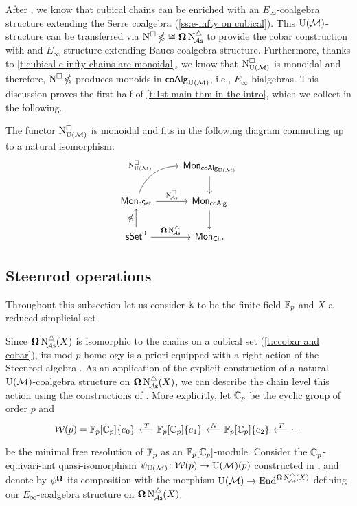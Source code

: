 After \cite{medina2022cube_einfty}, we know that cubical chains can be enriched with an $E_\infty$-coalgebra structure extending the Serre coalgebra (\cref{ss:e-infty on cubical}).
This ${\operatorname{U}(\mathcal{M})}$-structure can be transferred via $\operatorname{N^{\square}} \operatorname{\mathbb{\Omega}} \cong \operatorname{\mathbf{\Omega}} \operatorname{N^{\triangle}_{\!{\mathcal{A}\mathsf{s}}}}$ to provide the cobar construction with and $E_\infty$-structure extending Baues coalgebra structure.
Furthermore, thanks to \cref{t:cubical e-infty chains are monoidal}, we know that $\operatorname{N^{\square}_{{\operatorname{U}(\mathcal{M})}}}$ is monoidal and therefore, $\operatorname{N^{\square}} \operatorname{\mathbb{\Omega}}$ produces monoids in $\mathsf{coAlg}_{{\operatorname{U}(\mathcal{M})}}$, i.e., $E_\infty$-bialgebras.
This discussion proves the first half of \cref{t:1st main thm in the intro}, which we collect in the following.

\begin{lemma}\label{l:lift of cobar to e-infty}
	The functor $\operatorname{N^{\square}_{{\operatorname{U}(\mathcal{M})}}}$ is monoidal and fits in the following diagram commuting up to a natural isomorphism:
	\[
	\begin{tikzcd}
		& \Mon_{\coAlg_\UM} \arrow[d] \\
		\Mon_{\cSet} \arrow[ru, "\cchainsUM", out=70, in=180] \arrow[r, "\cchainsA"]
		& \Mon_{\coAlg} \arrow[d] \\
		\sSet^0 \arrow[r, "\cobar \schainsA"] \arrow[u, "\ccobar"]
		& \Mon_{\Ch}.
	\end{tikzcd}
	\]
\end{lemma}

\subsection{Steenrod operations}

Throughout this subsection let us consider $\Bbbk$ to be the finite field ${\mathbb{F}_p}$ and $X$ a reduced simplicial set.

Since $\operatorname{\mathbf{\Omega}} \operatorname{N^{\triangle}_{\!{\mathcal{A}\mathsf{s}}}}(X)$ is isomorphic to the chains on a cubical set (\cref{t:ccobar and cobar}), its mod $p$ homology is a priori equipped with a right action of the Steenrod algebra \cite{steenrod1962cohomology, milnor1958steenrod}.
As an application of the explicit construction of a natural ${\operatorname{U}(\mathcal{M})}$-coalgebra structure on $\operatorname{\mathbf{\Omega}} \operatorname{N^{\triangle}_{\!{\mathcal{A}\mathsf{s}}}}(X)$, we can describe the chain level this action using the constructions of \cite{medina2021may_st}.
More explicitly, let ${\mathbb{C}_p}$ be the cyclic group of order $p$ and
\[
\begin{tikzcd} [column sep = .5cm]
	\cW(p) = \Fp[\Cp]\{e_0\} & \arrow[l, "\,T"'] \Fp[\Cp]\{e_1\} & \arrow[l, "\,N"'] \Fp[\Cp]\{e_2\} & \arrow[l, "\,T"'] \dotsb
\end{tikzcd}
\]
be the minimal free resolution of ${\mathbb{F}_p}$ as an ${\mathbb{F}_p}[{\mathbb{C}_p}]$-module.
Consider the ${\mathbb{C}_p}$-equivari-ant quasi-isomorphism $\psi_{\operatorname{U}(\mathcal{M})} \colon \mathcal{W}(p) \to {\operatorname{U}(\mathcal{M})}(p)$ constructed in \cite{medina2021may_st}, and denote by $\psi^{\operatorname{\mathbf{\Omega}}}$ its composition with the morphism ${\operatorname{U}(\mathcal{M})} \to \mathrm{End}^{\operatorname{\mathbf{\Omega}} \operatorname{N^{\triangle}_{\!{\mathcal{A}\mathsf{s}}}}(X)}$ defining our $E_\infty$-coalgebra structure on $\operatorname{\mathbf{\Omega}} \operatorname{N^{\triangle}_{\!{\mathcal{A}\mathsf{s}}}}(X)$.

